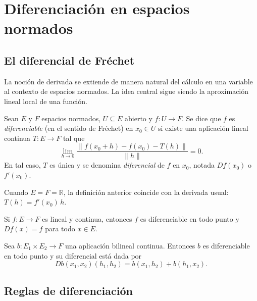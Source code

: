 \chapter{Diferenciación en espacios normados}
\label{ch:diferenciacion}

\section{El diferencial de Fréchet}

La noción de derivada se extiende de manera natural del cálculo en una variable
al contexto de espacios normados. La idea central sigue siendo la aproximación
lineal local de una función.

\begin{definition}\label{def:frechet}
Sean $E$ y $F$ espacios normados, $U\subseteq E$ abierto y $f\colon U\to F$.
Se dice que $f$ es \emph{diferenciable} (en el sentido de Fréchet) en
$x_0\in U$ si existe una aplicación lineal continua $T\colon E\to F$ tal que
\begin{equation}\label{eq:frechet}
  \lim_{h\to 0}\frac{\|f(x_0+h)-f(x_0)-T(h)\|}{\|h\|}=0.
\end{equation}
En tal caso, $T$ es única y se denomina \emph{diferencial} de $f$ en $x_0$,
notada $Df(x_0)$ o $f'(x_0)$.
\end{definition}

\begin{remark}
Cuando $E=F=\mathbb{R}$, la definición anterior coincide con la derivada usual:
$T(h)=f'(x_0)\,h$.
\end{remark}

\begin{example}\label{ej:derivada-lineal}
Si $f\colon E\to F$ es lineal y continua, entonces $f$ es diferenciable en
todo punto y $Df(x)=f$ para todo $x\in E$.
\end{example}

\begin{example}\label{ej:derivada-bilineal}
Sea $b\colon E_1\times E_2\to F$ una aplicación bilineal continua. Entonces $b$
es diferenciable en todo punto y su diferencial está dada por
\[
  Db(x_1,x_2)(h_1,h_2)=b(x_1,h_2)+b(h_1,x_2).
\]
\end{example}

\section{Reglas de diferenciación}

